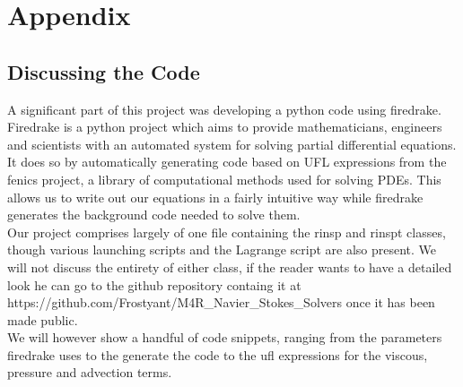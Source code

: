 \documentclass[11pt,twoside,a4paper]{article}
\begin{document}
\section{Appendix}
\subsection{Discussing the Code}
A significant part of this project was developing a python code using firedrake.
Firedrake is a python project which aims to provide mathematicians, engineers and scientists with an automated system for solving partial differential equations.\\
It does so by automatically generating code based on UFL expressions from the fenics project, a library of computational methods used for solving PDEs. This allows us to write out our equations in a fairly intuitive way while firedrake generates the background code needed to solve them.\\
Our project comprises largely of one file containing the rinsp and rinspt classes, though various launching scripts and the Lagrange script are also present. We will not discuss the entirety of either class, if the reader wants to have a detailed look he can go to the github repository containg it at https://github.com/Frostyant/M4R\_Navier\_Stokes\_Solvers once it has been made public.\\
We will however show a handful of code snippets, ranging from the parameters firedrake uses to the generate the code to the ufl expressions for the viscous, pressure and advection terms.
\end{document}
